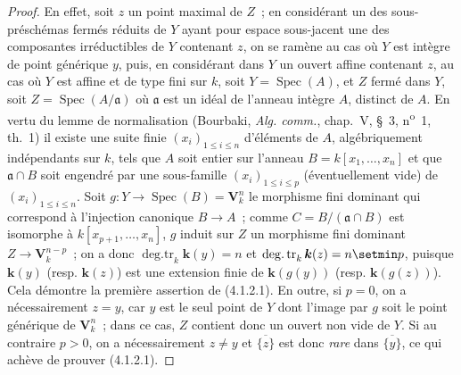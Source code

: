 \begin{proof}
En effet, soit $z$ un point maximal de $Z$~; en considérant un des
sous-préschémas fermés réduits de $Y$ ayant pour espace sous-jacent une des
composantes irréductibles de $Y$ contenant $z$, on se ramène au cas où $Y$ est
intègre de point générique $y$, puis, en considérant dans $Y$ un ouvert affine
contenant $z$, au cas où $Y$ est affine et de type fini sur $k$, soit
$Y=\operatorname{Spec}(A)$, et $Z$ fermé dans $Y$, soit
$Z=\operatorname{Spec}(A/\mathfrak a)$ où $\mathfrak a$ est un idéal de
l'anneau intègre $A$, distinct de $A$. En vertu du lemme de normalisation
(Bourbaki, \emph{Alg. comm.}, chap.~V, \S~3,
n\textsuperscript{o}~1, th.~1) il existe une suite finie
$(x_i)_{1\leqslant i\leqslant n}$ d'éléments de $A$, algébriquement
indépendants sur $k$, tels que $A$ soit entier sur l'anneau
$B=k[x_1,\ldots,x_n]$ et que $\mathfrak a\cap B$ soit engendré par une
sous-famille $(x_i)_{1\leqslant i\leqslant p}$ (éventuellement vide) de
$(x_i)_{1\leqslant i\leqslant n}$. Soit
$g:Y\to\operatorname{Spec}(B)=\mathbf V_k^n$ le morphisme fini dominant qui
correspond à l'injection canonique $B\to A$~; comme
$C=B/(\mathfrak a\cap B)$ est isomorphe à $k[x_{p+1},\ldots,x_n]$, $g$ induit
sur $Z$ un morphisme fini dominant $Z\to\mathbf V_k^{n-p}$~; on a donc
$\operatorname{deg.tr}_k \boldsymbol{k}(y)=n$ et
$\operatorname{deg.tr}_k \boldsymbol{k}(z)=n\setmin p$, puisque $\boldsymbol{k}(y)$ (resp. $\boldsymbol{k}(z)$) est une
extension finie de $\boldsymbol{k}(g(y))$ (resp. $\boldsymbol{k}(g(z))$). Cela démontre la première
assertion de (4.1.2.1). En outre, si $p=0$, on a nécessairement $z=y$, car $y$
est le seul point de $Y$ dont l'image par $g$ soit le point générique de
$\mathbf V_k^n$~; dans ce cas, $Z$ contient donc un ouvert non vide de $Y$. Si
au contraire $p>0$, on a nécessairement $z\neq y$ et
$\overline{\{z\}}$ est donc \emph{rare} dans $\overline{\{y\}}$, ce qui achève de
prouver (4.1.2.1).
\end{proof}

